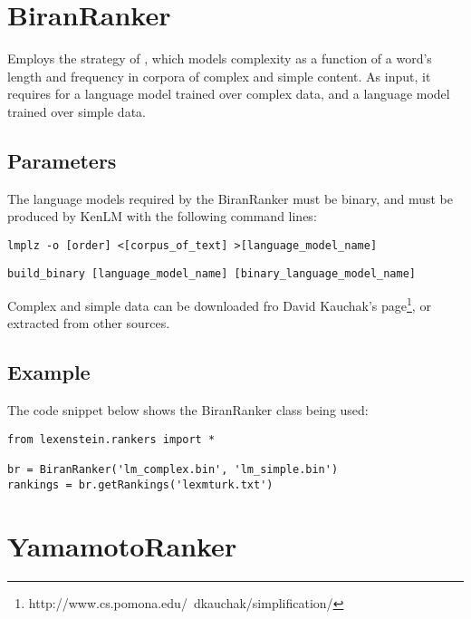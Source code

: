 \section{BiranRanker}

Employs the strategy of \cite{Biran2011}, which models complexity as a function of a word's length and frequency in corpora of complex and simple content. As input, it requires for a language model trained over complex data, and a language model trained over simple data.

\subsection{Parameters}

The language models required by the BiranRanker must be binary, and must be produced by KenLM with the following command lines:

\begin{lstlisting}
lmplz -o [order] <[corpus_of_text] >[language_model_name]
\end{lstlisting}
\begin{lstlisting}
build_binary [language_model_name] [binary_language_model_name]
\end{lstlisting}

Complex and simple data can be downloaded fro David Kauchak's page\footnote{http://www.cs.pomona.edu/~dkauchak/simplification/}, or extracted from other sources.

\subsection{Example}

The code snippet below shows the BiranRanker class being used:

\begin{lstlisting}
from lexenstein.rankers import *

br = BiranRanker('lm_complex.bin', 'lm_simple.bin')
rankings = br.getRankings('lexmturk.txt')
\end{lstlisting}















\section{YamamotoRanker}

